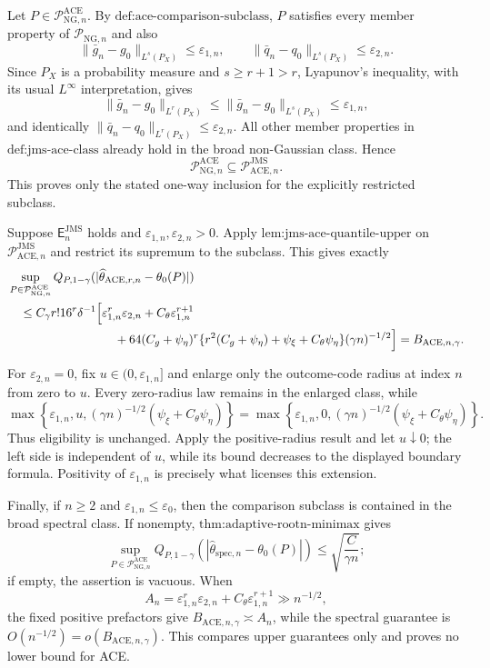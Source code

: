 Let \(P\in\mathcal P_{\mathrm{NG},n}^{\mathrm{ACE}}\).  By \(\text{def:ace-comparison-subclass}\), \(P\) satisfies every member property of \(\mathcal P_{\mathrm{NG},n}\) and also
\[
 \|\bar g_n-g_0\|_{L^s(P_X)}\le\varepsilon_{1,n},
 \qquad
 \|\bar q_n-q_0\|_{L^s(P_X)}\le\varepsilon_{2,n}.
\]
Since \(P_X\) is a probability measure and \(s\ge r+1>r\), Lyapunov's inequality, with its usual \(L^{\infty}\) interpretation, gives
\[
 \|\bar g_n-g_0\|_{L^r(P_X)}
 \le\|\bar g_n-g_0\|_{L^s(P_X)}
 \le\varepsilon_{1,n},
\]
and identically \(\|\bar q_n-q_0\|_{L^r(P_X)}\le\varepsilon_{2,n}\).  All other member properties in \(\text{def:jms-ace-class}\) already hold in the broad non-Gaussian class.  Hence
\[
 \mathcal P_{\mathrm{NG},n}^{\mathrm{ACE}}
 \subseteq\mathcal P_{\mathrm{ACE},n}^{\mathrm{JMS}}.
\]
This proves only the stated one-way inclusion for the explicitly restricted subclass.

Suppose \(\mathsf E_n^{\mathrm{JMS}}\) holds and \(\varepsilon_{1,n},\varepsilon_{2,n}>0\).  Apply \(\text{lem:jms-ace-quantile-upper}\) on \(\mathcal P_{\mathrm{ACE},n}^{\mathrm{JMS}}\) and restrict its supremum to the subclass.  This gives exactly
\[
\begin{aligned}
 &\sup_{P\in\mathcal P_{\mathrm{NG},n}^{\mathrm{ACE}}}
 Q_{P,1-\gamma}(|\widehat\theta_{\mathrm{ACE},r,n}-\theta_0(P)|)\\
 &\quad\le C_{\gamma}r!16^r\delta^{-1}
 \Big[\varepsilon_{1,n}^r\varepsilon_{2,n}
 +C_{\theta}\varepsilon_{1,n}^{r+1}\\
 &\hspace{31mm}
 +64(C_g+\psi_{\eta})^r
 \{r^2(C_g+\psi_{\eta})+\psi_{\xi}+C_{\theta}\psi_{\eta}\}
 (\gamma n)^{-1/2}\Big]
 =B_{\mathrm{ACE},n,\gamma}.
\end{aligned}
\]

For \(\varepsilon_{2,n}=0\), fix \(u\in(0,\varepsilon_{1,n}]\) and enlarge only the outcome-code radius at index \(n\) from zero to \(u\).  Every zero-radius law remains in the enlarged class, while
\[
 \max\!\left\{\varepsilon_{1,n},u,
 (\gamma n)^{-1/2}(\psi_{\xi}+C_{\theta}\psi_{\eta})\right\}
 =
 \max\!\left\{\varepsilon_{1,n},0,
 (\gamma n)^{-1/2}(\psi_{\xi}+C_{\theta}\psi_{\eta})\right\}.
\]
Thus eligibility is unchanged.  Apply the positive-radius result and let \(u\downarrow0\); the left side is independent of \(u\), while its bound decreases to the displayed boundary formula.  Positivity of \(\varepsilon_{1,n}\) is precisely what licenses this extension.

Finally, if \(n\ge2\) and \(\varepsilon_{1,n}\le\varepsilon_0\), then the comparison subclass is contained in the broad spectral class.  If nonempty, \(\text{thm:adaptive-rootn-minimax}\) gives
\[
 \sup_{P\in\mathcal P_{\mathrm{NG},n}^{\mathrm{ACE}}}
 Q_{P,1-\gamma}(|\widehat\theta_{\mathrm{spec},n}-\theta_0(P)|)
 \le\sqrt{\frac{C}{\gamma n}};
\]
if empty, the assertion is vacuous.  When
\[
 A_n=\varepsilon_{1,n}^r\varepsilon_{2,n}
 +C_{\theta}\varepsilon_{1,n}^{r+1}\gg n^{-1/2},
\]
the fixed positive prefactors give \(B_{\mathrm{ACE},n,\gamma}\asymp A_n\), while the spectral guarantee is \(O(n^{-1/2})=o(B_{\mathrm{ACE},n,\gamma})\).  This compares upper guarantees only and proves no lower bound for ACE.